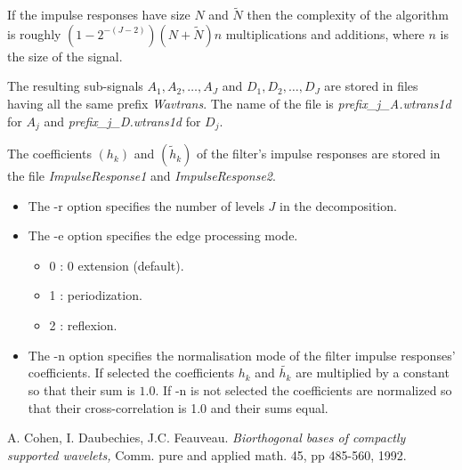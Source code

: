 If the impulse responses have size $N$ and $\tilde{N}$ then the complexity of the algorithm is roughly $(1 - 2^{-(J-2)})(N+\tilde{N})n$ multiplications and additions, where $n$ is the size of the signal. 

The resulting sub-signals \( A_{1}, A_{2}, \ldots, A_{J} \) and \( D_{1}, D_{2}, \ldots, D_{J} \) are stored in files having all the same prefix {\em Wavtrans}. The name of the file is {\em prefix\_j\_A.wtrans1d} for \( A_{j} \) and {\em prefix\_j\_D.wtrans1d} for \( D_{j} \).

The coefficients $(h_{k})$ and $(\tilde{h}_{k})$ of the filter's impulse responses are stored in the file {\em ImpulseResponse1} and {\em ImpulseResponse2}.

\begin{itemize}
\item
The -r option specifies the number of levels $J$ in the decomposition.
\item
The -e option specifies the edge processing mode.
\begin{itemize}
\item
0 : 0 extension (default).
\item
1 : periodization.
\item
2 : reflexion.
\end{itemize}
\item
The -n option specifies the normalisation mode of the filter impulse responses' coefficients. If selected the coefficients $h_{k}$ and $\tilde{h_{k}}$ are multiplied by a constant so that their sum is $1.0$. If -n is not selected the coefficients are normalized so that their cross-correlation is 1.0 and their sums equal. 
\end{itemize}


\begin{thebibliography}{CDF}

 A. Cohen, I. Daubechies, J.C. Feauveau. 
{\em Biorthogonal bases of compactly supported wavelets, } 
Comm. pure and applied math. 45, pp 485-560, 1992.

\end{thebibliography}





\parindent 0.0cm 
\parskip 0.0cm
